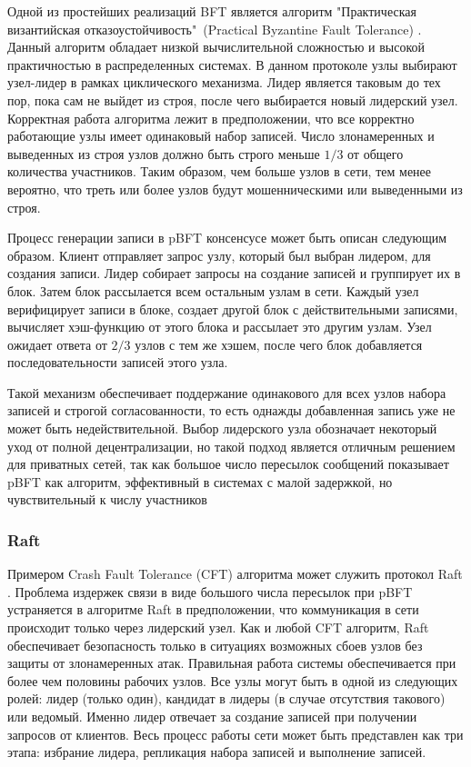 \documentclass[subf, href, colorlinks=true, 14pt,
times, mtpro, specialist]{disser}
\theoremstyle{definition}
\begin{document}
Одной из простейших реализаций BFT является алгоритм "Практическая византийская отказоустойчивость"\ (Practical Byzantine Fault Tolerance) \cite{Byzantine_Fault_Tolerance}. Данный алгоритм обладает низкой вычислительной сложностью и высокой практичностью в распределенных системах. В данном протоколе узлы выбирают узел-лидер в рамках циклического механизма. Лидер является таковым до тех пор, пока сам не выйдет из строя, после чего выбирается новый лидерский узел. Корректная работа алгоритма лежит в предположении, что все корректно работающие узлы имеет одинаковый набор записей. Число злонамеренных и выведенных из строя узлов должно быть строго меньше $1/3$ от общего количества участников. Таким образом, чем больше узлов в сети, тем менее вероятно, что треть или более узлов будут мошенническими или выведенными из строя. 

Процесс генерации записи в pBFT консенсусе может быть описан следующим образом. Клиент отправляет запрос узлу, который был выбран лидером, для создания записи. Лидер собирает запросы на создание записей и группирует их в блок. Затем блок рассылается всем остальным узлам в сети. Каждый узел верифицирует записи в блоке, создает другой блок с действительными записями, вычисляет хэш-функцию от этого блока и рассылает это другим узлам. Узел ожидает ответа от $2/3$ узлов с тем же хэшем, после чего блок добавляется последовательности записей этого узла.

Такой механизм обеспечивает поддержание одинакового для всех узлов набора записей и строгой согласованности, то есть однажды добавленная запись уже не может быть недействительной. Выбор лидерского узла обозначает некоторый уход от полной децентрализации, но такой подход является отличным решением для приватных сетей, так как большое число пересылок сообщений показывает pBFT как алгоритм, эффективный в системах с малой задержкой, но чувствительный к числу участников

\subsubsection{Raft}

Примером Crash Fault Tolerance (CFT) алгоритма может служить протокол Raft \cite{Raft_search}. Проблема издержек связи в виде большого числа пересылок при pBFT устраняется в алгоритме Raft в предположении, что коммуникация в сети происходит только через лидерский узел. Как и любой CFT алгоритм, Raft обеспечивает безопасность только в ситуациях возможных сбоев узлов без защиты от злонамеренных атак. Правильная работа системы обеспечивается при более чем половины рабочих узлов. Все узлы могут быть в одной из следующих ролей: лидер (только один), кандидат в лидеры (в случае отсутствия такового) или ведомый. Именно лидер отвечает за создание записей при получении запросов от клиентов. Весь процесс работы сети может быть представлен как три этапа: избрание лидера, репликация набора записей и выполнение записей.
\end{document}
